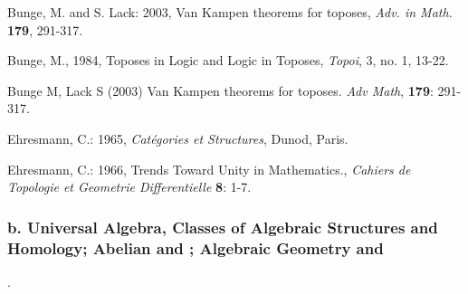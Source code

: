 \documentclass[12pt]{article}
\theoremstyle{plain}
\theoremstyle{definition}
\numberwithin{equation}{section}
\begin{document}
\begin{thebibliography}{99}
Bunge, M. and S. Lack: 2003, Van Kampen theorems for toposes, \emph{Adv. in Math.} \textbf{179}, 291-317.

Bunge, M., 1984, Toposes in Logic and Logic in Toposes, {\em Topoi}, 3, no. 1, 13-22. 

Bunge M, Lack S (2003) Van Kampen theorems for toposes. {\em Adv Math}, \textbf {179}: 291-317.

Ehresmann, C.: 1965, \emph{Cat\'egories et Structures}, Dunod, Paris.

Ehresmann, C.: 1966, Trends Toward Unity in Mathematics., \emph{Cahiers de Topologie et Geometrie Differentielle}
\textbf{8}: 1-7.

\end{thebibliography}


\subsubsection{b. Universal Algebra, Classes of Algebraic Structures and Homology; Abelian and 
; Algebraic 
Geometry and }.
 
\end{document}
